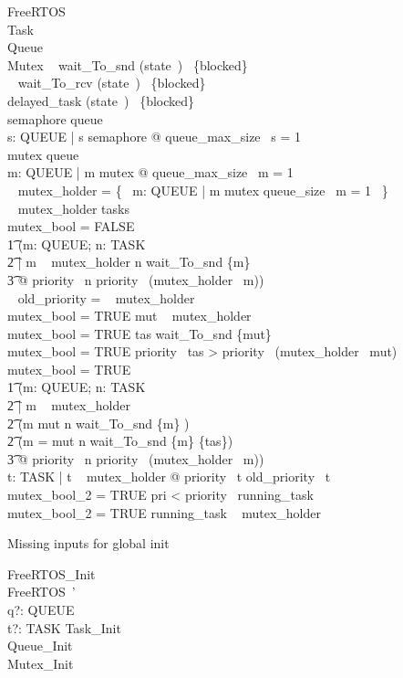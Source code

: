\begin{schema}{FreeRTOS}
\zstate\\
    Task\\
    Queue\\
    Mutex
\where
    \dom~ wait\_To\_snd \subseteq (state~\inv)~ \limg \{blocked\} \rimg\\
    \dom~ wait\_To\_rcv \subseteq (state~\inv)~ \limg \{blocked\} \rimg\\
    delayed\_task \subseteq (state~\inv)~ \limg \{blocked\} \rimg\\
    semaphore \subseteq queue\\
    \forall s: QUEUE | s \in semaphore @ queue\_max\_size~ s = 1\\
    mutex \subseteq queue\\
    \forall m: QUEUE | m \in mutex @ queue\_max\_size~ m = 1\\
    \dom~ mutex\_holder = \{~ m: QUEUE | m \in mutex \land queue\_size~ m = 1 ~\}\\
    \ran~ mutex\_holder \subseteq tasks\\
    mutex\_bool = FALSE\\
    \t1 \implies (\forall m: QUEUE; n: TASK\\
    \t2     | m \in \dom~ mutex\_holder \land n \in wait\_To\_snd \inv \limg \{m\} \rimg\\
    \t3         @ priority~ n \leq priority~ (mutex\_holder~ m))\\
    \dom~ old\_priority = \ran~ mutex\_holder\\
    mutex\_bool = TRUE \implies mut \in \dom~ mutex\_holder\\
    mutex\_bool = TRUE \implies tas \in wait\_To\_snd \inv \limg \{mut\} \rimg\\
    mutex\_bool = TRUE \implies priority~ tas > priority~ (mutex\_holder~ mut)\\
    mutex\_bool = TRUE\\
    \t1 \implies (\forall m: QUEUE; n: TASK\\
    \t2     | m \in \dom~ mutex\_holder\\
    \t2     \land (m \neq mut \implies n \in wait\_To\_snd \inv \limg \{m\} \rimg)\\
    \t2     \land (m = mut \implies n \in wait\_To\_snd \inv \limg \{m\} \rimg \setminus \{tas\})\\
    \t3         @ priority~ n \leq priority~ (mutex\_holder~ m))\\
    \forall t: TASK | t \in \ran~ mutex\_holder @ priority~ t \geq old\_priority~ t\\
    mutex\_bool\_2 = TRUE \implies pri < priority~ running\_task\\
    mutex\_bool\_2 = TRUE \implies running\_task \notin \ran~ mutex\_holder
\end{schema}

Missing inputs for global init
\begin{schema}{FreeRTOS\_Init}
\zstinit\\
	FreeRTOS~' \\
	q?: QUEUE \\
	t?: TASK
\where
    Task\_Init \\
    Queue\_Init \\
    Mutex\_Init
\end{schema}
